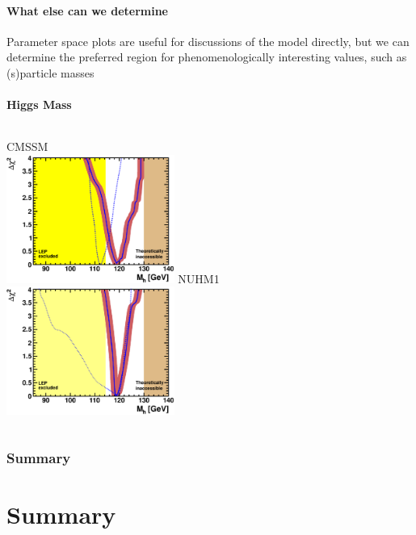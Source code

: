 \documentclass{beamer}
\begin{document}
\subsection{What else can we determine}
\begin{frame}{\insertsubsection}
Parameter space plots are useful for discussions of the model directly, but we
can determine the preferred region for phenomenologically interesting values,
such as (s)particle masses
\end{frame}

\subsection{Higgs Mass}
\begin{frame}{\insertsubsection}
\begin{columns}[l]
    CMSSM\\
    \includegraphics[height=4.2cm]{mh_cmssm.eps}
    NUHM1\\
    \includegraphics[height=4.2cm]{mh_nuhm1.eps}\\
\end{columns}
\end{frame}

\section{Summary}
\part{Summary}
\end{document}

